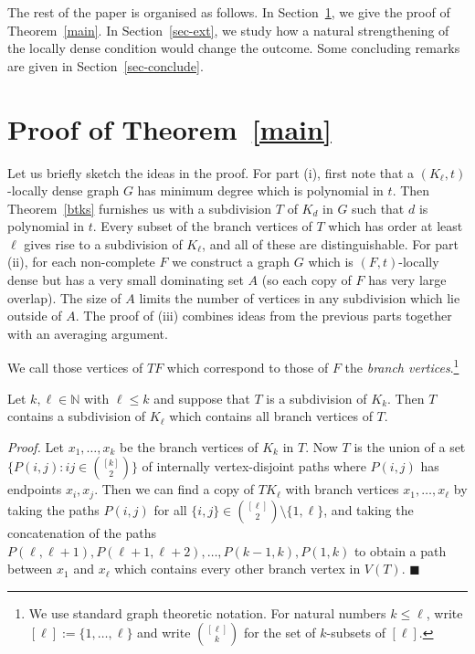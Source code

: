 \documentclass[12pt]{amsart}
\begin{document}
The rest of the paper is organised as follows. In Section~\ref{sec-main}, we give the proof of Theorem~\ref{main}. In Section~\ref{sec-ext}, we study how a natural strengthening of the locally dense condition would change the outcome. Some concluding remarks are given in Section~\ref{sec-conclude}.



\section{Proof of Theorem~\ref{main}}\label{sec-main}

Let us briefly sketch the ideas in the proof.
For part (i), first note that a $(K_\ell,t)$-locally dense graph $G$ has minimum degree which is polynomial in $t$.
Then Theorem~\ref{btks} furnishes us with a subdivision $T$ of $K_d$ in $G$ such that $d$ is polynomial in $t$.
Every subset of the branch vertices of $T$ which has order at least $\ell$ gives rise to a subdivision of $K_\ell$, and all of these are distinguishable.
For part (ii), for each non-complete $F$ we construct a graph $G$ which is $(F,t)$-locally dense but has a very small dominating set $A$ (so each copy of $F$ has very large overlap).
The size of $A$ limits the number of vertices in any subdivision which lie outside of $A$.
The proof of (iii) combines ideas from the previous parts together with an averaging argument.

\medskip
We call those vertices of $TF$ which correspond to those of $F$ the \emph{branch vertices}.\footnote{We use standard graph theoretic notation. For natural numbers $k \leq \ell$, write $[\ell] := \lbrace 1,\ldots, \ell \rbrace$ and write $\binom{[\ell]}{k}$ for the set of $k$-subsets of $[\ell]$.}

\begin{proposition}\label{easy}
Let $k,\ell \in \mathbb{N}$ with $\ell \leq k$ and suppose that $T$ is a subdivision of $K_k$.
Then $T$ contains a subdivision of $K_\ell$ which contains all branch vertices of $T$.
\end{proposition}

\medskip
\noindent
\emph{Proof.}
Let $x_1,\ldots,x_k$ be the branch vertices of $K_k$ in $T$.
Now $T$ is the union of a set $\lbrace P(i,j): ij \in \binom{[k]}{2} \rbrace$ of internally vertex-disjoint paths where $P(i,j)$ has endpoints $x_i, x_j$.
Then we can find a copy of $TK_\ell$ with branch vertices $x_1,\ldots,x_\ell$ by taking the paths $P(i,j)$ for all $\lbrace i,j \rbrace \in \binom{[\ell]}{2} \setminus \lbrace  1,\ell \rbrace$, and taking the concatenation of the paths $P(\ell,\ell+1), P(\ell+1,\ell+2), \ldots, P(k-1,k),P(1,k)$
to obtain a path between $x_1$ and $x_\ell$ which contains every other branch vertex in $V(T)$.
\hfill$\blacksquare$
\end{document}
